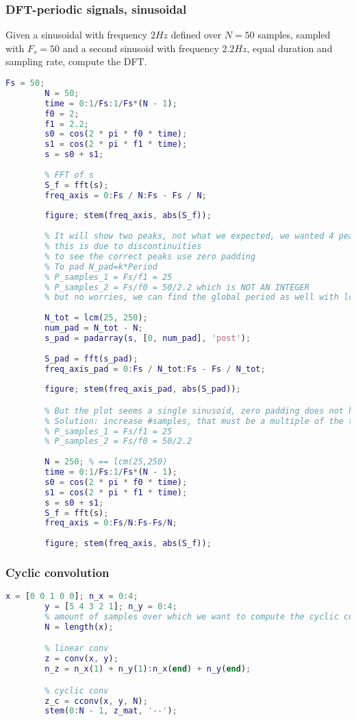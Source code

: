     \subsubsection{DFT-periodic signals, sinusoidal}
    Given a sinusoidal with frequency $2Hz$ defined over $N=50$ samples, sampled with $F_s=50$ and a second sinusoid with frequency $2.2Hz$, equal duration and sampling rate, compute the DFT.
    \begin{lstlisting}[language=Matlab, escapeinside=`']
        Fs = 50;
        N = 50;
        time = 0:1/Fs:1/Fs*(N - 1);
        f0 = 2;
        f1 = 2.2;
        s0 = cos(2 * pi * f0 * time);
        s1 = cos(2 * pi * f1 * time);        
        s = s0 + s1;
                
        % FFT of s
        S_f = fft(s);
        freq_axis = 0:Fs / N:Fs - Fs / N;
        
        figure; stem(freq_axis, abs(S_f));
        
        % It will show two peaks, not what we expected, we wanted 4 peaks
        % this is due to discontinuities
        % to see the correct peaks use zero padding
        % To pad N_pad=k*Period
        % P_samples_1 = Fs/f1 = 25
        % P_samples_2 = Fs/f0 = 50/2.2 which is NOT AN INTEGER
        % but no worries, we can find the global period as well with lcm of
        
        N_tot = lcm(25, 250);
        num_pad = N_tot - N;
        s_pad = padarray(s, [0, num_pad], 'post');
        
        S_pad = fft(s_pad);
        freq_axis_pad = 0:Fs / N_tot:Fs - Fs / N_tot;
        
        figure; stem(freq_axis_pad, abs(S_pad));

        % But the plot seems a single sinusoid, zero padding does not help here!
        % Solution: increase #samples, that must be a multiple of the two periods
        % P_samples_1 = Fs/f1 = 25
        % P_samples_2 = Fs/f0 = 50/2.2
        
        N = 250; % == lcm(25,250)
        time = 0:1/Fs:1/Fs*(N - 1);
        s0 = cos(2 * pi * f0 * time);
        s1 = cos(2 * pi * f1 * time);        
        s = s0 + s1;
        S_f = fft(s);
        freq_axis = 0:Fs/N:Fs-Fs/N;
        
        figure; stem(freq_axis, abs(S_f));
    \end{lstlisting}

    \subsubsection{Cyclic convolution}
    \begin{lstlisting}[language=Matlab, escapeinside=`']
        x = [0 0 1 0 0]; n_x = 0:4;
        y = [5 4 3 2 1]; n_y = 0:4;
        % amount of samples over which we want to compute the cyclic conv
        N = length(x);

        % linear conv
        z = conv(x, y);
        n_z = n_x(1) + n_y(1):n_x(end) + n_y(end);

        % cyclic conv
        z_c = cconv(x, y, N);
        stem(0:N - 1, z_mat, '--');
    \end{lstlisting}   

